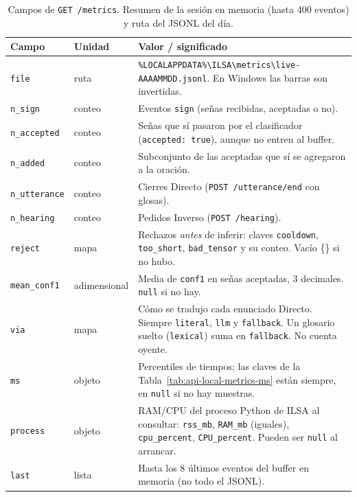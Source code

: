 \begin{table}[H]
  \centering
  \caption{Campos de \texttt{GET /metrics}. Resumen de la sesión en memoria (hasta 400 eventos) y ruta del JSONL del día.}
  \label{tab:api-local-metrics}
  \small
  \begin{tabularx}{\textwidth}{@{}>{\raggedright\arraybackslash}p{5.15cm} l >{\raggedright\arraybackslash}X@{}}
    \toprule
    \textbf{Campo} & \textbf{Unidad} & \textbf{Valor / significado} \\
    \midrule
    \texttt{file} & ruta & \texttt{\%LOCALAPPDATA\%\allowbreak\textbackslash ILSA\allowbreak\textbackslash metrics\allowbreak\textbackslash live-AAAAMMDD.jsonl}. En Windows las barras son invertidas. \\
    \texttt{n\_sign} & conteo & Eventos \texttt{sign} (señas recibidas, aceptadas o no). \\
    \texttt{n\_accepted} & conteo & Señas que sí pasaron por el clasificador (\texttt{accepted: true}), aunque no entren al buffer. \\
    \texttt{n\_added} & conteo & Subconjunto de las aceptadas que sí se agregaron a la oración. \\
    \texttt{n\_utterance} & conteo & Cierres Directo (\texttt{POST /utterance/end} con glosas). \\
    \texttt{n\_hearing} & conteo & Pedidos Inverso (\texttt{POST /hearing}). \\
    \texttt{reject} & mapa & Rechazos \emph{antes} de inferir: claves \texttt{cooldown}, \texttt{too\_short}, \texttt{bad\_tensor} y su conteo. Vacío \{\} si no hubo. \\
    \texttt{mean\_conf1} & adimensional & Media de \texttt{conf1} en señas aceptadas, 3 decimales. \texttt{null} si no hay. \\
    \texttt{via} & mapa & Cómo se tradujo cada enunciado Directo. Siempre \texttt{literal}, \texttt{llm} y \texttt{fallback}. Un glosario suelto (\texttt{lexical}) suma en \texttt{fallback}. No cuenta oyente. \\
    \texttt{ms} & objeto & Percentiles de tiempos; las claves de la Tabla~\ref{tab:api-local-metrics-ms} están siempre, en \texttt{null} si no hay muestras. \\
    \texttt{process} & objeto & RAM/CPU del proceso Python de ILSA al consultar: \texttt{rss\_mb}, \texttt{RAM\_mb} (iguales), \texttt{cpu\_percent}, \texttt{CPU\_percent}. Pueden ser \texttt{null} al arrancar. \\
    \texttt{last} & lista & Hasta los 8 últimos eventos del buffer en memoria (no todo el JSONL). \\
    \bottomrule
  \end{tabularx}
\end{table}

